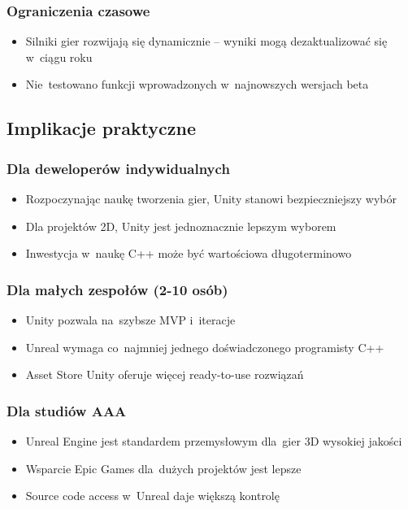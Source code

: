 \subsubsection{Ograniczenia czasowe}

\begin{itemize}
    \item Silniki gier rozwijają się dynamicznie -- wyniki mogą dezaktualizować się w~ciągu roku
    \item Nie~testowano funkcji wprowadzonych w~najnowszych wersjach beta
\end{itemize}

\subsection{Implikacje praktyczne}

\subsubsection{Dla deweloperów indywidualnych}

\begin{itemize}
    \item Rozpoczynając naukę tworzenia gier, Unity stanowi bezpieczniejszy wybór
    \item Dla projektów 2D, Unity jest jednoznacznie lepszym wyborem
    \item Inwestycja w~naukę C++ może być wartościowa długoterminowo
\end{itemize}

\subsubsection{Dla małych zespołów (2-10 osób)}

\begin{itemize}
    \item Unity pozwala na~szybsze MVP i~iteracje
    \item Unreal wymaga co~najmniej jednego doświadczonego programisty C++
    \item Asset Store Unity oferuje więcej ready-to-use rozwiązań
\end{itemize}

\subsubsection{Dla studiów AAA}

\begin{itemize}
    \item Unreal Engine jest standardem przemysłowym dla~gier 3D wysokiej jakości
    \item Wsparcie Epic Games dla~dużych projektów jest lepsze
    \item Source code access w~Unreal daje większą kontrolę
\end{itemize}
